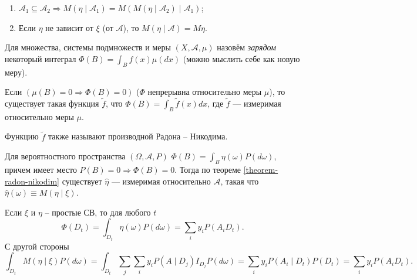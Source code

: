 \begin{enumerate}
\begin{proof}
      Правая часть:
      \[
        \zeta M(\eta \mid  \mathscr{A}) = \sum_s z_s I_{D_s} \sum_i y_i \sum_j
        P(A_i \mid  D_j) I_{D_j}
        = \sum_s z_s I_{D_s} \sum_i y_i P(A_i \mid  D_s).
      \]
    \end{proof}

  \item $\mathscr{A}_1 \subseteq \mathscr{A}_2 \Rightarrow M(\eta \mid
    \mathscr{A}_1) = M( M(\eta \mid  \mathscr{A}_2) \mid  \mathscr{A}_1)$;

  \item Если $\eta$ не зависит от $\xi$ (от $\mathscr{A}$), то $M(\eta \mid  \mathscr{A}) = M\eta$.
\end{enumerate}

\begin{theorem}\label{theorem-radon-nikodim}
  Для множества, системы подмножеств и меры $(X, \mathscr{A}, \mu)$ назовём
  \emph{зарядом}
  некоторый интеграл $\Phi(B) = \int_B f(x) \mu(dx)$ (можно мыслить себе как новую меру).

  Если $(\mu(B) = 0 \Rightarrow \Phi(B) = 0)$ ($\Phi$ непрерывна относительно
  меры $\mu$),
  то существует такая функция $ \tilde f $, что 
  $\Phi(B) = \int_B \tilde f(x) dx$, где $\tilde f$ --- измеримая относительно
  меры $\mu$.

  Функцию $\tilde f$ также называют производной Радона -- Никодима.
\end{theorem}

\begin{definition}
  Для вероятностного пространства $(\Omega, \mathscr{A}, P)$ 
  $\Phi(B) = \int_B \eta(\omega) P(d\omega)$, причем имеет место $P(B) = 0
  \Rightarrow \Phi(B) = 0 $. Тогда по теореме \ref{theorem-radon-nikodim}
  существует $\hat{\eta}$ --- измеримая относительно $\mathscr{A}$, такая что
  $\hat{\eta} (\omega) \equiv M(\eta \mid  \xi)$.
\end{definition}

\begin{ex}
  Если $\xi$ и $\eta$ -- простые СВ, то 
  для любого $ t $
  \[
    \Phi(D_t) = \int_{D_t} \eta(\omega) P(d\omega) = \sum_i y_i P(A_i D_t).
  \]
  С другой стороны
  \[
    \int_{D_t} M(\eta \mid  \xi) P(d\omega) = \int_{D_t} \sum_j \sum_i y_i
    P(A\mid D_j) I_{D_j} P(d\omega)
    = \sum_i y_i P(A_i\mid D_t) P(D_t) = \sum_i y_i P(A_i D_t).
  \]
\end{ex}





